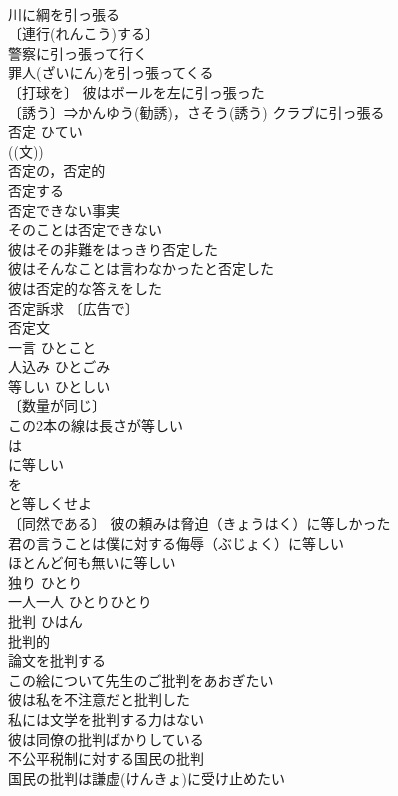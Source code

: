 \documentclass[8pt]{extreport}
\begin{document}
\begin{CJK}{UTF8}{min}
\\	川に綱を引っ張る 
\\	〔連行(れんこう)する〕 
\\	警察に引っ張って行く 
\\	罪人(ざいにん)を引っ張ってくる 
\\	〔打球を〕 彼はボールを左に引っ張った 
\\	〔誘う〕⇒かんゆう(勧誘)，さそう(誘う) クラブに引っ張る 
\\	否定	ひてい	
\\	((文)) 
\\	否定の，否定的 
\\	否定する 
\\	否定できない事実 
\\	そのことは否定できない 
\\	彼はその非難をはっきり否定した 
\\	彼はそんなことは言わなかったと否定した 
\\	彼は否定的な答えをした 
\\	否定訴求 〔広告で〕
\\	否定文 
\\	一言	ひとこと	
\\	人込み	ひとごみ	
\\	等しい	ひとしい	
\\	〔数量が同じ〕
\\	この2本の線は長さが等しい 
\\	は
\\	に等しい 
\\	を
\\	と等しくせよ 
\\	〔同然である〕 彼の頼みは脅迫（きょうはく）に等しかった 
\\	君の言うことは僕に対する侮辱（ぶじょく）に等しい 
\\	ほとんど何も無いに等しい 
\\	独り	ひとり	
\\	一人一人	ひとりひとり	
\\	批判	ひはん	
\\	批判的 
\\	論文を批判する 
\\	この絵について先生のご批判をあおぎたい 
\\	彼は私を不注意だと批判した 
\\	私には文学を批判する力はない 
\\	彼は同僚の批判ばかりしている 
\\	不公平税制に対する国民の批判 
\\	国民の批判は謙虚(けんきょ)に受け止めたい 

\end{CJK}
\end{document}

